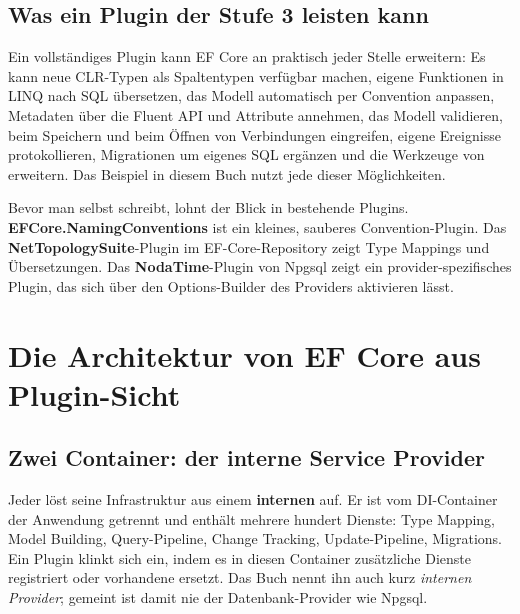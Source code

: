\section{Was ein Plugin der Stufe 3 leisten kann}

Ein vollständiges Plugin kann EF Core an praktisch jeder Stelle erweitern: Es kann neue
CLR-Typen als Spaltentypen verfügbar machen, eigene Funktionen in LINQ nach SQL übersetzen,
das Modell automatisch per Convention anpassen, Metadaten über die Fluent API und Attribute
annehmen, das Modell validieren, beim Speichern und beim Öffnen von Verbindungen eingreifen,
eigene Ereignisse protokollieren, Migrationen um eigenes SQL ergänzen und die Werkzeuge von
 erweitern. Das Beispiel in diesem Buch nutzt jede dieser Möglichkeiten.

\begin{tip}
  Bevor man selbst schreibt, lohnt der Blick in bestehende Plugins.
  \textbf{EFCore.NamingConventions} ist ein kleines, sauberes Convention-Plugin. Das
  \textbf{NetTopologySuite}-Plugin im EF-Core-Repository zeigt Type Mappings und
  Übersetzungen. Das \textbf{NodaTime}-Plugin von Npgsql zeigt ein provider-spezifisches
  Plugin, das sich über den Options-Builder des Providers aktivieren lässt.
\end{tip}

\chapter{Die Architektur von EF Core aus Plugin-Sicht}\label{ch:ef-core-s-architecture-from}

\section{Zwei Container: der interne Service Provider}

Jeder  löst seine Infrastruktur aus einem \textbf{internen}
 auf. Er ist vom DI-Container der Anwendung getrennt und
enthält mehrere hundert Dienste: Type Mapping, Model Building, Query-Pipeline, Change
Tracking, Update-Pipeline, Migrations. Ein Plugin klinkt sich ein, indem es in diesen
Container zusätzliche Dienste registriert oder vorhandene ersetzt. Das Buch nennt ihn auch kurz
\emph{internen Provider}; gemeint ist damit nie der Datenbank-Provider wie Npgsql.


